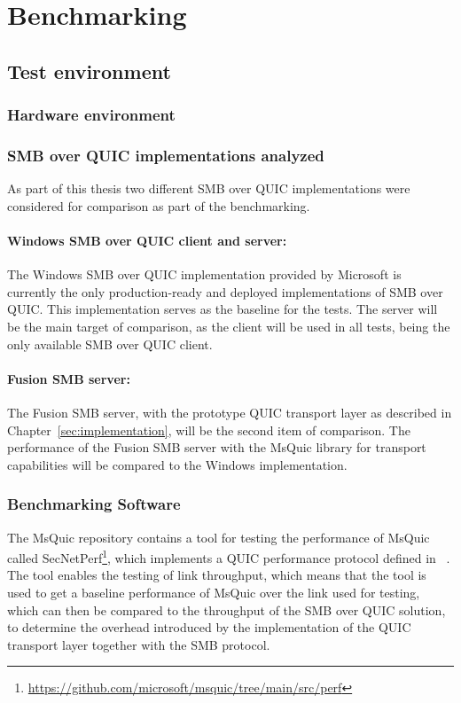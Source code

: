 \documentclass[english, 12pt, a4paper, elec, utf8, a-2b, online]{aaltothesis}
\begin{document}
\clearpage
\section{Benchmarking}
\label{sec:benchmark}
\subsection{Test environment}

\subsubsection{Hardware environment}

\subsubsection{SMB over QUIC implementations analyzed}
As part of this thesis two different SMB over QUIC implementations were considered
for comparison as part of the benchmarking.
\paragraph{Windows SMB over QUIC client and server:}

The Windows SMB over QUIC implementation provided by Microsoft is currently
the only production-ready and deployed implementations of SMB over QUIC. This implementation
serves as the baseline for the tests. The server will be the main target of comparison,
as the client will be used in all tests, being the only available SMB over QUIC client.

\paragraph{Fusion SMB server:}

The Fusion SMB server, with the prototype QUIC transport layer as described in
Chapter~\ref{sec:implementation}, will be the second item of comparison. The performance
of the Fusion SMB server with the MsQuic library for transport capabilities will
be compared to the Windows implementation.

\subsubsection{Benchmarking Software}
The MsQuic repository contains a tool for testing the performance of MsQuic called
SecNetPerf\footnote{\url{https://github.com/microsoft/msquic/tree/main/src/perf}},
which implements a QUIC performance protocol defined in ~\cite{banks-quic-performance-00}.
The tool enables the testing of link throughput, which means that the tool is used
to get a baseline performance of MsQuic over the link used for testing, which can then
be compared to the throughput of the SMB over QUIC solution, to determine the overhead
introduced by the implementation of the QUIC transport layer together with the SMB protocol.
\end{document}
